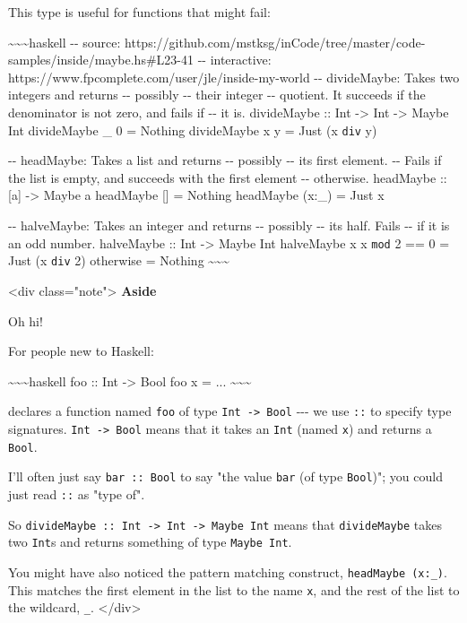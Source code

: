 \documentclass[]{article}
\begin{document}
This type is useful for functions that might fail:

\textasciitilde{}\textasciitilde{}\textasciitilde{}haskell -\/- source:
https://github.com/mstksg/inCode/tree/master/code-samples/inside/maybe.hs\#L23-41
-\/- interactive: https://www.fpcomplete.com/user/jle/inside-my-world -\/-
divideMaybe: Takes two integers and returns -\/- possibly -\/- their integer
-\/- quotient. It succeeds if the denominator is not zero, and fails if -\/- it
is. divideMaybe :: Int -\textgreater{} Int -\textgreater{} Maybe Int divideMaybe
\_ 0 = Nothing divideMaybe x y = Just (x \texttt{div} y)

-\/- headMaybe: Takes a list and returns -\/- possibly -\/- its first element.
-\/- Fails if the list is empty, and succeeds with the first element -\/-
otherwise. headMaybe :: {[}a{]} -\textgreater{} Maybe a headMaybe {[}{]} =
Nothing headMaybe (x:\_) = Just x

-\/- halveMaybe: Takes an integer and returns -\/- possibly -\/- its half. Fails
-\/- if it is an odd number. halveMaybe :: Int -\textgreater{} Maybe Int
halveMaybe x \textbar{} x \texttt{mod} 2 == 0 = Just (x \texttt{div} 2)
\textbar{} otherwise = Nothing
\textasciitilde{}\textasciitilde{}\textasciitilde{}

\textless{}div class="note"\textgreater{} \textbf{Aside}

Oh hi!

For people new to Haskell:

\textasciitilde{}\textasciitilde{}\textasciitilde{}haskell foo :: Int
-\textgreater{} Bool foo x = ...
\textasciitilde{}\textasciitilde{}\textasciitilde{}

declares a function named \texttt{foo} of type
\texttt{Int\ -\textgreater{}\ Bool} -\/-\/- we use \texttt{::} to specify type
signatures. \texttt{Int\ -\textgreater{}\ Bool} means that it takes an
\texttt{Int} (named \texttt{x}) and returns a \texttt{Bool}.

I'll often just say \texttt{bar\ ::\ Bool} to say "the value \texttt{bar} (of
type \texttt{Bool})"; you could just read \texttt{::} as "type of".

So
\texttt{divideMaybe\ ::\ Int\ -\textgreater{}\ Int\ -\textgreater{}\ Maybe\ Int}
means that \texttt{divideMaybe} takes two \texttt{Int}s and returns something of
type \texttt{Maybe\ Int}.

You might have also noticed the pattern matching construct,
\texttt{headMaybe\ (x:\_)}. This matches the first element in the list to the
name \texttt{x}, and the rest of the list to the wildcard, \texttt{\_}.
\textless{}/div\textgreater{}
\end{document}
